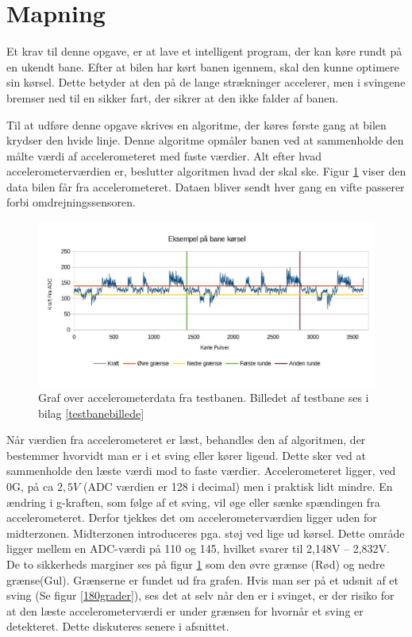 \section{Mapning}
\label{mapning}
Et krav til denne opgave, er at lave et intelligent program, der kan køre rundt på en ukendt bane. Efter at bilen har kørt banen igennem, skal den kunne optimere sin kørsel. Dette betyder at den på de lange strækninger accelerer, men i svingene bremser ned til en sikker fart, der sikrer at den ikke falder af banen.

Til at udføre denne opgave skrives en algoritme, der køres første gang at bilen krydser den hvide linje. Denne algoritme opmåler banen ved at sammenholde den målte værdi af accelerometeret med faste værdier. Alt efter hvad accelerometerværdien er, beslutter algoritmen hvad der skal ske.
Figur \ref{testbanegraf2} viser den data bilen får fra accelerometeret. Dataen bliver sendt hver gang en vifte passerer forbi omdrejningssensoren.\\

\begin{figure}[h!]
\centering
\includegraphics[scale=0.25]{./Graphics/banekorsel}
\caption{Graf over accelerometerdata fra testbanen. Billedet af testbane ses i bilag \ref{testbanebillede}}
\label{testbanegraf2}
\end{figure}

Når værdien fra accelerometeret er læst, behandles den af algoritmen, der bestemmer hvorvidt man er i et sving eller kører ligeud. Dette sker ved at sammenholde den læste værdi mod to faste værdier. Accelerometeret ligger, ved 0G, på ca $2,5 V$ (ADC værdien er 128 i decimal) men i praktisk lidt mindre. En ændring i g-kraften, som følge af et sving, vil øge eller sænke spændingen fra accelerometeret. Derfor tjekkes det om accelerometerværdien ligger uden for midterzonen. Midterzonen introduceres pga. støj ved lige ud kørsel. Dette område ligger mellem en ADC-værdi på 110 og 145, hvilket svarer til 2,148V – 2,832V. De to 
sikkerheds marginer ses på figur \ref{testbanegraf2} som den øvre grænse (Rød) og nedre grænse(Gul). Grænserne er fundet ud fra grafen.
Hvis man ser på et udsnit af et sving (Se figur \ref{180grader}), ses det at selv når den er i svinget, er der risiko for at den læste accelerometerværdi er under grænsen for hvornår et sving er detekteret. Dette diskuteres senere i afsnittet.\\

